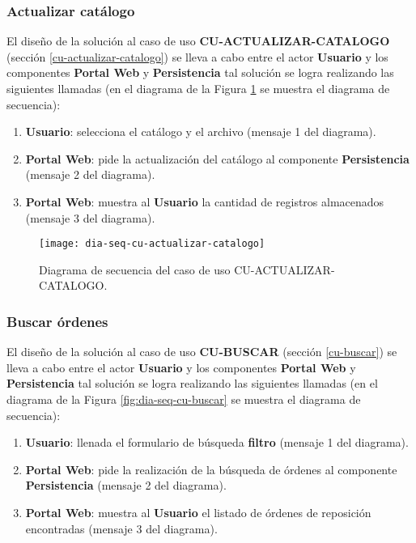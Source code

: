 \subsubsection{Actualizar catálogo}
El diseño de la solución al caso de uso \textbf{CU-ACTUALIZAR-CATALOGO} (sección \ref{cu-actualizar-catalogo}) se lleva a cabo entre el actor \textbf{Usuario} y los componentes \textbf{Portal Web} y \textbf{Persistencia} tal solución se logra realizando las siguientes llamadas (en el diagrama de la Figura \ref{fig:dia-seq-cu-actualizar-catalogo} se muestra el diagrama de secuencia):
\begin{enumerate}
	\item \textbf{Usuario}: selecciona el catálogo y el archivo (mensaje 1 del diagrama).
	\item \textbf{Portal Web}: pide la actualización del catálogo al componente \textbf{Persistencia} (mensaje 2 del diagrama).
	\item \textbf{Portal Web}: muestra al \textbf{Usuario} la cantidad de registros almacenados (mensaje 3 del diagrama).
\end{enumerate}

\begin{figure}[h]
	\centering
	\texttt{[image: dia-seq-cu-actualizar-catalogo]}
	\caption{Diagrama de secuencia del caso de uso CU-ACTUALIZAR-CATALOGO.}
	\label{fig:dia-seq-cu-actualizar-catalogo}
\end{figure}

\subsubsection{Buscar órdenes}
El diseño de la solución al caso de uso \textbf{CU-BUSCAR} (sección \ref{cu-buscar}) se lleva a cabo entre el actor \textbf{Usuario} y los componentes \textbf{Portal Web} y \textbf{Persistencia} tal solución se logra realizando las siguientes llamadas (en el diagrama de la Figura \ref{fig:dia-seq-cu-buscar} se muestra el diagrama de secuencia):
\begin{enumerate}
	\item \textbf{Usuario}: llenada el formulario de búsqueda \textbf{filtro} (mensaje 1 del diagrama).
	\item \textbf{Portal Web}: pide la realización de la búsqueda de órdenes al componente \textbf{Persistencia} (mensaje 2 del diagrama).
	\item \textbf{Portal Web}: muestra al \textbf{Usuario} el listado de órdenes de reposición encontradas (mensaje 3 del diagrama).
\end{enumerate}

